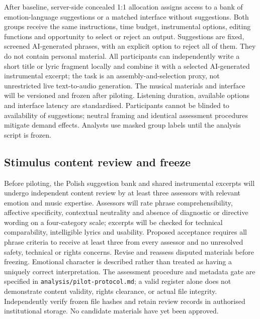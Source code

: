 \documentclass[11pt,a4paper]{article}
\begin{document}
After baseline, server-side concealed 1:1 allocation assigns access to a bank of emotion-language suggestions or a matched interface without suggestions. Both groups receive the same instructions, time budget, instrumental options, editing functions and opportunity to select or reject an output. Suggestions are fixed, screened AI-generated phrases, with an explicit option to reject all of them. They do not contain personal material. All participants can independently write a short title or lyric fragment locally and combine it with a selected AI-generated instrumental excerpt; the task is an assembly-and-selection proxy, not unrestricted live text-to-audio generation. The musical materials and interface will be versioned and frozen after piloting. Listening duration, available options and interface latency are standardised. Participants cannot be blinded to availability of suggestions; neutral framing and identical assessment procedures mitigate demand effects. Analysts use masked group labels until the analysis script is frozen.

\subsection{Stimulus content review and freeze}
Before piloting, the Polish suggestion bank and shared instrumental excerpts will undergo independent content review by at least three assessors with relevant emotion and music expertise. Assessors will rate phrase comprehensibility, affective specificity, contextual neutrality and absence of diagnostic or directive wording on a four-category scale; excerpts will be checked for technical comparability, intelligible lyrics and usability. Proposed acceptance requires all phrase criteria to receive at least three from every assessor and no unresolved safety, technical or rights concerns. Revise and reassess disputed materials before freezing. Emotional character is described rather than treated as having a uniquely correct interpretation. The assessment procedure and metadata gate are specified in \texttt{analysis/pilot-protocol.md}; a valid register alone does not demonstrate content validity, rights clearance, or actual file integrity. Independently verify frozen file hashes and retain review records in authorised institutional storage. No candidate materials have yet been approved.
\end{document}
